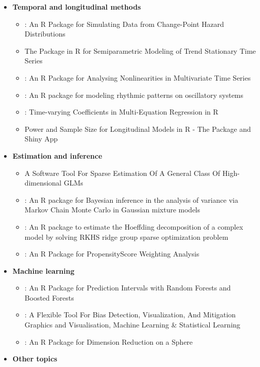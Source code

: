 \begin{itemize}
\tightlist
\item
  \textbf{Temporal and longitudinal methods}

  \begin{itemize}
  \tightlist
  \item
    : An R Package for Simulating Data from Change-Point Hazard Distributions
  \item
    The  Package in R for Semiparametric Modeling of Trend Stationary Time Series
  \item
    : An R Package for Analysing Nonlinearities in Multivariate Time Series
  \item
    : An R package for modeling rhythmic patterns on oscillatory systems
  \item
    : Time-varying Coefficients in Multi-Equation Regression in R
  \item
    Power and Sample Size for Longitudinal Models in R - The  Package and Shiny App
  \end{itemize}
\item
  \textbf{Estimation and inference}

  \begin{itemize}
  \item
     A Software Tool For Sparse Estimation Of A General Class Of High-dimensional GLMs
  \item
    : An R package for Bayesian inference in the analysis of variance via Markov Chain Monte Carlo in Gaussian mixture models
  \item
    : An R package to estimate the Hoeffding decomposition of a complex model by solving RKHS ridge group sparse optimization problem
  \item
    : An R Package for PropensityScore Weighting Analysis
  \end{itemize}
\item
  \textbf{Machine learning}

  \begin{itemize}
  \item
    : An R Package for Prediction Intervals with Random Forests and Boosted Forests
  \item
    : A Flexible Tool For Bias Detection, Visualization, And Mitigation Graphics and Visualisation, Machine Learning \& Statistical Learning
  \item
    : An R Package for Dimension Reduction on a Sphere
  \end{itemize}
\item
  \textbf{Other topics}


\end{itemize}

